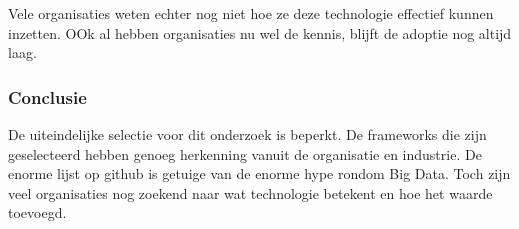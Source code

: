 Vele organisaties weten echter nog niet hoe ze deze technologie effectief kunnen inzetten. OOk al hebben organisaties nu wel de kennis, blijft de adoptie nog altijd laag. \parencite{hadoop2015adoption}


\begin{comment}
De evolutie van distributed applictions Google File System -> Map Reduce -> Apache Hadoop -> Hype is groot maar Mainstream Adoption is nog erg laag, complex landschap. De organisatie heeft eerder een Proof Of Concept gerealiseerd maar zag op tegen het beheer van een cluster. 
Tegenwoordig is er ook success met hadoop in de cloud, aangeboden door Amazon EMR.
Minpunten:
- Hoge kosten
- Opstart tijd van 17 minuten (zie benchmarks Spark vs Hadoop)

Alternatief Spark erg enthasiaust vanuit het development Team, ook mogelijk op Amazon EMR
\end{comment}





\subsubsection{\textbf{Conclusie}}

De uiteindelijke selectie voor dit onderzoek is beperkt. De frameworks die zijn geselecteerd hebben genoeg herkenning vanuit de organisatie en industrie. De enorme lijst op github is getuige van de enorme hype rondom Big Data. Toch zijn veel organisaties nog zoekend naar wat technologie betekent en hoe het waarde toevoegd\parencite{hadoop2015adoption}.

